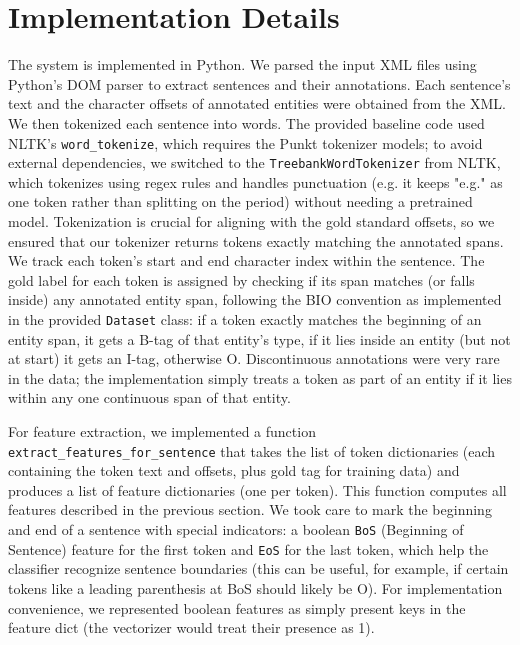 \section{Implementation Details}
\label{sec:implementation}

The system is implemented in Python. We parsed the input XML files using Python's DOM parser to extract sentences and their annotations. Each sentence's text and the character offsets of annotated entities were obtained from the XML. We then tokenized each sentence into words. The provided baseline code used NLTK's \texttt{word\_tokenize}, which requires the Punkt tokenizer models; to avoid external dependencies, we switched to the \texttt{TreebankWordTokenizer} from NLTK, which tokenizes using regex rules and handles punctuation (e.g. it keeps "e.g." as one token rather than splitting on the period) without needing a pretrained model. Tokenization is crucial for aligning with the gold standard offsets, so we ensured that our tokenizer returns tokens exactly matching the annotated spans. We track each token's start and end character index within the sentence. The gold label for each token is assigned by checking if its span matches (or falls inside) any annotated entity span, following the BIO convention as implemented in the provided \texttt{Dataset} class: if a token exactly matches the beginning of an entity span, it gets a B-tag of that entity's type, if it lies inside an entity (but not at start) it gets an I-tag, otherwise O. Discontinuous annotations were very rare in the data; the implementation simply treats a token as part of an entity if it lies within any one continuous span of that entity.

For feature extraction, we implemented a function \texttt{extract\_features\_for\_sentence} that takes the list of token dictionaries (each containing the token text and offsets, plus gold tag for training data) and produces a list of feature dictionaries (one per token). This function computes all features described in the previous section. We took care to mark the beginning and end of a sentence with special indicators: a boolean \texttt{BoS} (Beginning of Sentence) feature for the first token and \texttt{EoS} for the last token, which help the classifier recognize sentence boundaries (this can be useful, for example, if certain tokens like a leading parenthesis at BoS should likely be O). For implementation convenience, we represented boolean features as simply present keys in the feature dict (the vectorizer would treat their presence as 1).

